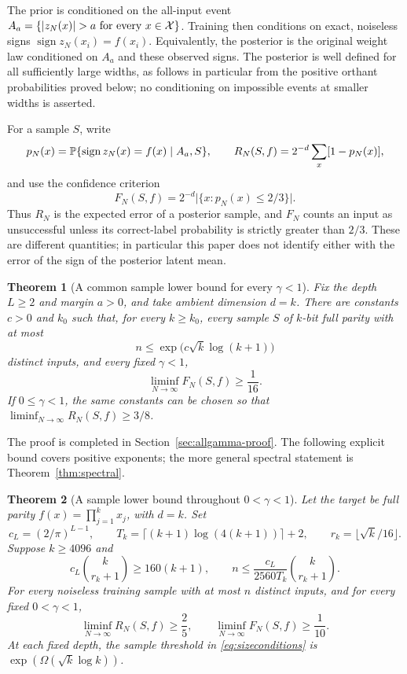 \documentclass[11pt]{article}
\newtheorem{theorem}{Theorem}[section]
\theoremstyle{remark}\newtheorem{remark}[theorem]{Remark}
\DeclareMathOperator{\sign}{sign}\DeclareMathOperator{\Var}{Var}
\begin{document}
The prior is conditioned on the all-input event
$A_a=\{|z_N(x)|>a\text{ for every }x\in\X\}$.
Training then conditions on exact, noiseless signs
$\sign z_N(x_i)=f(x_i)$. Equivalently, the posterior is the original
weight law conditioned on $A_a$ and these observed signs.
The posterior is well defined for all sufficiently large widths,
as follows in particular from the positive orthant probabilities
proved below; no conditioning on impossible events at smaller widths
is asserted.

For a sample $S$, write
\[
 p_N(x)=\Pp\{\sign z_N(x)=f(x)\mid A_a,S\},\qquad
 R_N(S,f)=2^{-d}\sum_x[1-p_N(x)],
\]
and use the confidence criterion
\begin{equation}\label{eq:confidence}
 F_N(S,f)=2^{-d}\bigl|\{x:p_N(x)\le2/3\}\bigr|.
\end{equation}
Thus $R_N$ is the expected error of a posterior sample, and $F_N$
counts an input as unsuccessful unless its correct-label probability
is strictly greater than $2/3$. These are different quantities; in
particular this paper does not identify either with the error of the
sign of the posterior latent mean.

\begin{theorem}[A common sample lower bound for every $\gamma<1$]
\label{thm:allgamma}
Fix the depth $L\ge2$ and margin $a>0$, and take ambient dimension
$d=k$. There are constants $c>0$
and $k_0$ such that, for every $k\ge k_0$, every sample $S$ of
$k$-bit full parity with at most
\[
 n\le\exp\!\bigl(c\sqrt{k}\log(k+1)\bigr)
\]
distinct inputs, and every fixed $\gamma<1$,
\[
 \liminf_{N\to\infty}F_N(S,f)\ge\frac1{16}.
\]
If $0\le\gamma<1$, the same constants can be chosen so that
$\liminf_{N\to\infty}R_N(S,f)\ge3/8$.
\end{theorem}

The proof is completed in Section~\ref{sec:allgamma-proof}. The
following explicit bound covers positive exponents; the more general
spectral statement is Theorem~\ref{thm:spectral}.

\begin{theorem}[A sample lower bound throughout $0<\gamma<1$]
\label{thm:main}
Let the target be full parity $f(x)=\prod_{j=1}^k x_j$, with $d=k$.
Set
\[
 c_L=(2/\pi)^{L-1},\qquad
 T_k=\lceil(k+1)\log(4(k+1))\rceil+2,\qquad
 r_k=\lfloor\sqrt{k}/16\rfloor.
\]
Suppose $k\ge4096$ and
\begin{equation}\label{eq:sizeconditions}
 c_L\binom{k}{r_k+1}\ge160(k+1),\qquad
 n\le \frac{c_L}{2560T_k}\binom{k}{r_k+1}.
\end{equation}
For every noiseless training sample with at most $n$ distinct inputs,
and for every fixed $0<\gamma<1$,
\begin{equation}\label{eq:mainbounds}
 \liminf_{N\to\infty}R_N(S,f)\ge\frac25,
 \qquad
 \liminf_{N\to\infty}F_N(S,f)\ge\frac1{10}.
\end{equation}
At each fixed depth, the sample threshold in
\eqref{eq:sizeconditions} is $\exp(\Omega(\sqrt{k}\log k))$.
\end{theorem}
\end{document}

